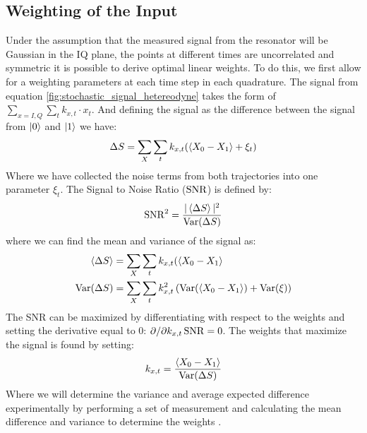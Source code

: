 \subsection{Weighting of the Input}
Under the assumption that the measured signal from the resonator will be Gaussian in the IQ plane, the points at different times are uncorrelated and symmetric \cite{magesan}  it is possible to derive optimal linear weights. To do this, we first allow for a weighting parameters at each time step in each quadrature. The signal from equation \ref{fig:stochastic_signal_hetereodyne} takes the form of $\sum_{x = I, Q}\sum_t k_{x, t} \cdot x_t$. And defining the signal as the difference between the signal from $\ket{0}$ and $\ket{1}$ we have:
\begin{equation}
    \Delta S = \sum_X \sum_t k_{x, t} (\expval{X_0 - X_1} + \xi_t)
\end{equation}
Where we have collected the noise terms from both trajectories into one parameter $\xi_t$. The Signal to Noise Ratio ($\operatorname{SNR}$) is defined by: %
\begin{equation}
    \operatorname{SNR}^2 = \frac{|\expval{\Delta S}|^2}{\operatorname{Var}(\Delta S)} 
\end{equation}
where we can find the mean and variance of the signal as:
\begin{align}
    \expval{\Delta S} &= \sum_X \sum_t k_{x, t} (\expval{X_0 - X_1} \\
    \operatorname{Var}(\Delta S) &= \sum_X \sum_t k_{x, t}^2 \left( \operatorname{Var}(\expval{X_0 - X_1}) + \operatorname{Var}(\xi) \right)
\end{align}
The SNR can be maximized by differentiating with respect to the weights and setting the derivative equal to $0$: $\partial / \partial k_{x, t} \operatorname{SNR} = 0$. The weights that maximize the signal is found by  setting:
\begin{equation}
    k_{x, t} = \frac{\expval{X_0 - X_1}}{\operatorname{Var}(\Delta S)}
\end{equation}
Where we will determine the variance and average expected difference experimentally by performing a set of measurement and calculating the mean difference and variance to determine the weights \cite{ryan}.

